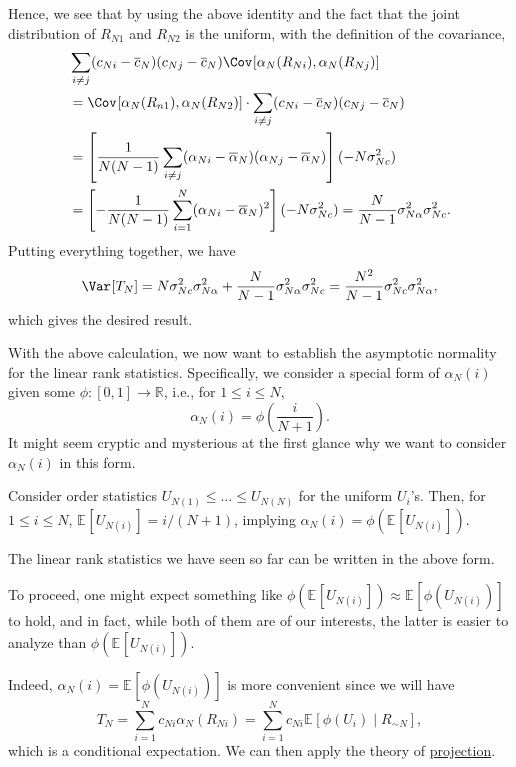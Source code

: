 \begin{explanation}
	Hence, we see that by using the above identity and the fact that the joint distribution of \(R_{N1}\) and \(R_{N2}\) is the uniform, with the definition of the covariance,
	\begin{align*}
		 & \sum_{i \neq j} (c_{Ni} - \overline{c} _N)(c_{Nj} - \overline{c} _N) \Cov_{}[\alpha _N(R_{Ni}) , \alpha _N(R_{Nj})]                                \\
		 & = \Cov_{}[\alpha _N(R_{n1}), \alpha _N(R_{N2})] \cdot \sum_{i \neq j} (c_{Ni} - \overline{c} _N)(c_{Nj} - \overline{c} _N)                         \\
		 & = \left[ \frac{1}{N(N-1)} \sum_{i \neq j} (\alpha _{Ni} - \overline{\alpha} _N) (\alpha _{Nj} - \overline{\alpha} _N) \right] (- N \sigma _{Nc}^2) \\
		 & = \left[ - \frac{1}{N(N-1)} \sum_{i=1}^{N} (\alpha _{Ni} - \overline{\alpha} _N)^2 \right] (- N \sigma _{Nc}^2)
		= \frac{N}{N-1} \sigma _{N \alpha }^2 \sigma _{Nc}^2 .
	\end{align*}
	Putting everything together, we have
	\[
		\Var_{}[T_N]
		= N \sigma _{Nc}^2 \sigma _{N \alpha }^2 + \frac{N}{N-1} \sigma _{N \alpha }^2 \sigma _{Nc}^2
		= \frac{N^2}{N-1}\sigma _{Nc}^2 \sigma _{N \alpha }^2,
	\]
	which gives the desired result.
\end{explanation}

With the above calculation, we now want to establish the asymptotic normality for the linear rank statistics. Specifically, we consider a special form of \(\alpha _N(i)\) given some \(\phi \colon [0, 1] \to \mathbb{R} \), i.e., for \(1 \leq i \leq N\),
\[
	\alpha _N(i) = \phi \left( \frac{i}{N+1} \right) .
\]
It might seem cryptic and mysterious at the first glance why we want to consider \(\alpha _N(i)\) in this form.

\begin{intuition}
	Consider order statistics \(U_{N(1)} \leq \dots \leq U_{N(N)}\) for the uniform \(U_i\)'s. Then, for \(1 \leq i \leq N\), \(\mathbb{E}_{}[U_{N(i)}] = i / (N+1)\), implying \(\alpha _N(i) = \phi (\mathbb{E}_{}[U_{N(i)}] )\).
\end{intuition}

\begin{eg}
	The linear rank statistics we have seen so far can be written in the above form.
\end{eg}

To proceed, one might expect something like \(\phi (\mathbb{E}_{}[U_{N(i)}] ) \approx \mathbb{E}_{}[\phi (U_{N(i)})] \) to hold, and in fact, while both of them are of our interests, the latter is easier to analyze than \(\phi (\mathbb{E}_{}[U_{N(i)}] )\).

\begin{intuition}
	Indeed, \(\alpha _N(i) = \mathbb{E}_{}[\phi (U_{N(i)})]\) is more convenient since we will have
	\[
		T_N
		= \sum_{i=1}^{N} c_{Ni} \alpha _N(R_{Ni})
		= \sum_{i=1}^{N} c_{Ni} \mathbb{E}_{}[\phi (U_i) \mid R_{\sim N}] ,
	\]
	which is a conditional expectation. We can then apply the theory of \hyperref[def:projection]{projection}.
\end{intuition}